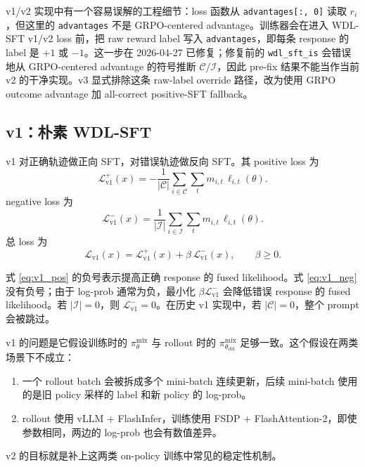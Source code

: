 v1/v2 实现中有一个容易误解的工程细节：loss 函数从 \texttt{advantages[:, 0]} 读取 $r_i$，但这里的 \texttt{advantages} 不是 GRPO-centered advantage。训练器会在进入 WDL-SFT v1/v2 loss 前，把 raw reward label 写入 \texttt{advantages}，即每条 response 的 label 是 $+1$ 或 $-1$。这一步在 2026-04-27 已修复；修复前的 \texttt{wdl\_sft\_is} 会错误地从 GRPO-centered advantage 的符号推断 $\mathcal{C}/\mathcal{I}$，因此 pre-fix 结果不能当作当前 v2 的干净实现。v3 显式排除这条 raw-label override 路径，改为使用 GRPO outcome advantage 加 all-correct positive-SFT fallback。

\subsection{v1：朴素 WDL-SFT}
\label{subsec:v1}

v1 对正确轨迹做正向 SFT，对错误轨迹做反向 SFT。其 positive loss 为
\begin{equation}
    \mathcal{L}^{+}_{\mathrm{v1}}(x)
    =
    -\frac{1}{|\mathcal{C}|}
    \sum_{i\in\mathcal{C}}\sum_t
    m_{i,t}\,\ell_{i,t}(\theta).
    \label{eq:v1_pos}
\end{equation}
negative loss 为
\begin{equation}
    \mathcal{L}^{-}_{\mathrm{v1}}(x)
    =
    \frac{1}{|\mathcal{I}|}
    \sum_{i\in\mathcal{I}}\sum_t
    m_{i,t}\,\ell_{i,t}(\theta).
    \label{eq:v1_neg}
\end{equation}
总 loss 为
\begin{equation}
    \mathcal{L}_{\mathrm{v1}}(x)
    =
    \mathcal{L}^{+}_{\mathrm{v1}}(x)
    +
    \beta\,\mathcal{L}^{-}_{\mathrm{v1}}(x),
    \qquad
    \beta\ge 0.
    \label{eq:v1_total}
\end{equation}

式 \eqref{eq:v1_pos} 的负号表示提高正确 response 的 fused likelihood。式 \eqref{eq:v1_neg} 没有负号；由于 log-prob 通常为负，最小化 $\beta\mathcal{L}^{-}_{\mathrm{v1}}$ 会降低错误 response 的 fused likelihood。若 $|\mathcal{I}|=0$，则 $\mathcal{L}^{-}_{\mathrm{v1}}=0$。在历史 v1 实现中，若 $|\mathcal{C}|=0$，整个 prompt 会被跳过。

v1 的问题是它假设训练时的 $\pi_\theta^{\mathrm{mix}}$ 与 rollout 时的 $\pi_{\theta_{\mathrm{old}}}^{\mathrm{mix}}$ 足够一致。这个假设在两类场景下不成立：
\begin{enumerate}
    \item 一个 rollout batch 会被拆成多个 mini-batch 连续更新，后续 mini-batch 使用的是旧 policy 采样的 label 和新 policy 的 log-prob。
    \item rollout 使用 vLLM + FlashInfer，训练使用 FSDP + FlashAttention-2，即使参数相同，两边的 log-prob 也会有数值差异。
\end{enumerate}
v2 的目标就是补上这两类 on-policy 训练中常见的稳定性机制。

